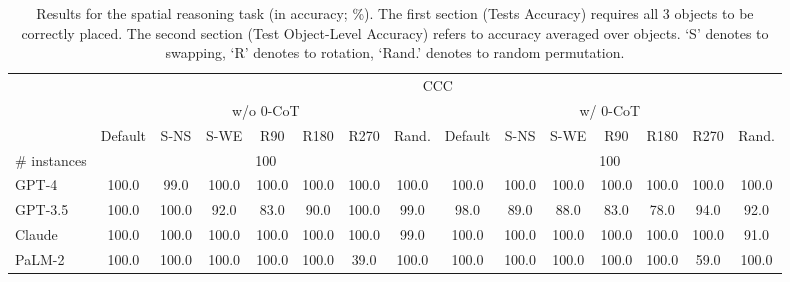 \begin{table}[t!]
{\begin{tabular}{lcccccccccccccc}
    \midrule
     & \multicolumn{14}{c}{CCC} \\
     \cmidrule(lr){2-15}
      & \multicolumn{7}{c}{w/o 0-CoT} & \multicolumn{7}{c}{w/ 0-CoT} \\
     \cmidrule(lr){2-8} \cmidrule(lr){9-15}
    & Default & S-NS & S-WE & R90 & R180 & R270 & Rand. & Default & S-NS & S-WE & R90 & R180 & R270 & Rand. \\
    \midrule
    \# instances &  \multicolumn{7}{c}{100} & \multicolumn{7}{c}{100}  \\
    \midrule
    GPT-4 & 100.0 & \phantom{0}99.0 & 100.0 & 100.0 & 100.0 & 100.0 & 100.0 & 100.0 & 100.0 & 100.0 & 100.0 & 100.0 & 100.0 & 100.0 \\
    GPT-3.5 & 100.0 & 100.0 & \phantom{0}92.0 & \phantom{0}83.0 & \phantom{0}90.0 & 100.0 & \phantom{0}99.0 & \phantom{0}98.0 & \phantom{0}89.0 & \phantom{0}88.0 & \phantom{0}83.0 & \phantom{0}78.0 & \phantom{0}94.0 & \phantom{0}92.0 \\
    Claude & 100.0 & 100.0 & 100.0 & 100.0 & 100.0 & 100.0 & \phantom{0}99.0 & 100.0 & 100.0 & 100.0 & 100.0 & 100.0 & 100.0 & \phantom{0}91.0 \\
    PaLM-2 & 100.0 & 100.0 & 100.0 & 100.0 & 100.0 & \phantom{0}39.0 & 100.0 & 100.0 & 100.0 & 100.0 & 100.0 & 100.0 & \phantom{0}59.0 & 100.0 \\
    \bottomrule
    \end{tabular}
    }
    \caption{\label{tab:numbers-spatial}Results for the spatial reasoning task (in accuracy; \%). The first section (Tests Accuracy) requires all 3 objects to be correctly placed. The second section (Test Object-Level Accuracy) refers to accuracy averaged over objects. `S' denotes to swapping, `R' denotes to rotation, `Rand.' denotes to random permutation.}
\end{table}
